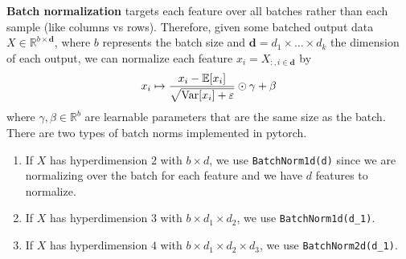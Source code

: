   \begin{definition}
    \textbf{Batch normalization} targets each feature over all batches rather than each sample (like columns vs rows). Therefore, given some batched output data $X \in \mathbb{R}^{b \times \mathbf{d}}$, where $b$ represents the batch size and $\mathbf{d} = d_1 \times \ldots \times d_k$ the dimension of each output, we can normalize each feature $x_i = X_{:,i \in \mathbf{d}}$ by 
    \begin{equation}
      x_i \mapsto \frac{x_i - \mathbb{E}[x_i]}{\sqrt{\operatorname{Var}[x_i] + \varepsilon}} \odot \gamma + \beta
    \end{equation}
    where $\gamma, \beta \in \mathbb{R}^b$ are learnable parameters that are the same size as the batch. There are two types of batch norms implemented in pytorch. 
    \begin{enumerate}
      \item If $X$ has hyperdimension $2$ with $b \times d$, we use \texttt{BatchNorm1d(d)} since we are normalizing over the batch for each feature and we have $d$ features to normalize. 
      \item If $X$ has hyperdimension $3$ with $b \times d_1 \times d_2$, we use \texttt{BatchNorm1d(d\_1)}. 
      \item If $X$ has hyperdimension $4$ with $b \times d_1 \times d_2 \times d_3$, we use \texttt{BatchNorm2d(d\_1)}. 
    \end{enumerate}
  \end{definition}

